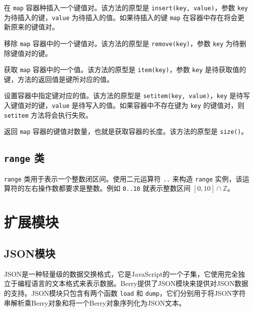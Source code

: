 在 \texttt{map} 容器种插入一个键值对。该方法的原型是 \texttt{insert(key, value)}，参数 \texttt{key} 为待插入的键，\texttt{value} 为待插入的值。如果待插入的键 \texttt{map} 在容器中存在将会更新原来的键值对。


移除 \texttt{map} 容器中的一个键值对。该方法的原型是 \texttt{remove(key)}，参数 \texttt{key} 为待删除键值对的键。


获取 \texttt{map} 容器中的一个值。该方法的原型是 \texttt{item(key)}，参数 \texttt{key} 是待获取值的键，方法的返回值是键所对应的值。


设置容器中指定键对应的值。该方法的原型是 \texttt{setitem(key, value)}，\texttt{key} 是待写入键值对的键，\texttt{value} 是待写入的值。如果容器中不存在键为 \texttt{key} 的键值对，则 \texttt{setitem} 方法将会执行失败。


返回 \texttt{map} 容器的键值对数量，也就是获取容器的长度。该方法的原型是 \texttt{size()}。

\subsection{\texttt{range} 类}

\texttt{range} 类用于表示一个整数闭区间。使用二元运算符 \texttt{..} 来构造 \texttt{range} 实例，该运算符的左右操作数都要求是整数。例如 \texttt{0..10} 就表示整数区间 $[0,10]\cap\mathbb{Z}$。

\section{扩展模块}
\subsection{JSON模块}

JSON是一种轻量级的数据交换格式，它是JavaScript的一个子集，它使用完全独立于编程语言的文本格式来表示数据。Berry提供了JSON模块来提供对JSON数据的支持。JSON模块只包含有两个函数 \texttt{load} 和 \texttt{dump}，它们分别用于将JSON字符串解析乘Berry对象和将一个Berry对象序列化为JSON文本。

